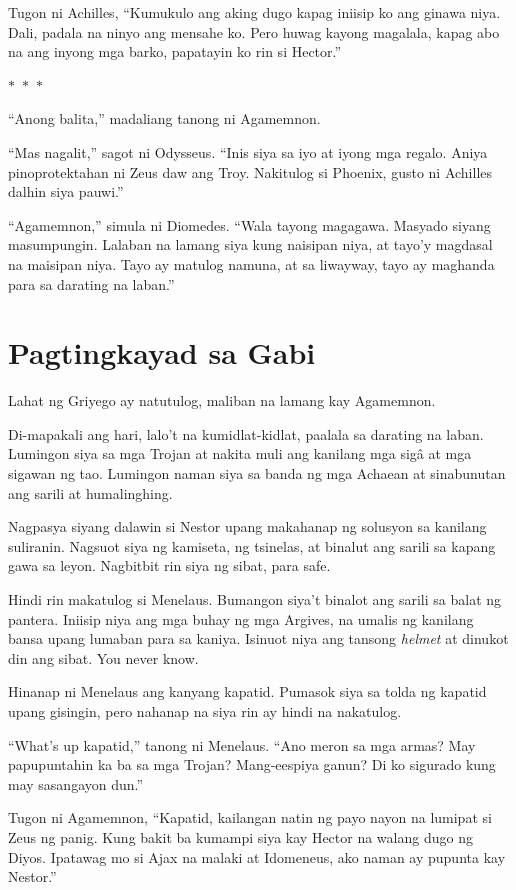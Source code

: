 \documentclass[12pt,letterpaper]{report}
\newcommand{\seperate}{\begin{center}$\ast$~$\ast$~$\ast$\end{center}}
\begin{document}
Tugon ni Achilles, ``Kumukulo ang aking dugo kapag iniisip ko ang ginawa niya. Dali, padala na ninyo ang mensahe ko. Pero huwag kayong magalala, kapag abo na ang inyong mga barko, papatayin ko rin si Hector.''

\seperate

``Anong balita,'' madaliang tanong ni Agamemnon.

``Mas nagalit,'' sagot ni Odysseus. ``Inis siya sa iyo at iyong mga regalo. Aniya pinoprotektahan ni Zeus daw ang Troy. Nakitulog si Phoenix, gusto ni Achilles dalhin siya pauwi.''

``Agamemnon,'' simula ni Diomedes. ``Wala tayong magagawa. Masyado siyang masumpungin. Lalaban na lamang siya kung naisipan niya, at tayo'y magdasal na maisipan niya. Tayo ay matulog namuna, at sa liwayway, tayo ay maghanda para sa darating na laban.''

\pagebreak

\chapter{Pagtingkayad sa Gabi} %

Lahat ng Griyego ay natutulog, maliban na lamang kay Agamemnon.

Di-mapakali ang hari, lalo't na kumidlat-kidlat, paalala sa darating na laban. Lumingon siya sa mga Trojan at nakita muli ang kanilang mga sig\^a at mga sigawan ng tao. Lumingon naman siya sa banda ng mga Achaean at sinabunutan ang sarili at humalinghing.

Nagpasya siyang dalawin si Nestor upang makahanap ng solusyon sa kanilang suliranin. Nagsuot siya ng kamiseta, ng tsinelas, at binalut ang sarili sa kapang gawa sa leyon. Nagbitbit rin siya ng sibat, para safe.

Hindi rin makatulog si Menelaus. Bumangon siya't binalot ang sarili sa balat ng pantera. Iniisip niya ang mga buhay ng mga Argives, na umalis ng kanilang bansa upang lumaban para sa kaniya. Isinuot niya ang tansong \textit{helmet} at dinukot din ang sibat. You never know.

Hinanap ni Menelaus ang kanyang kapatid. Pumasok siya sa tolda ng kapatid upang gisingin, pero nahanap na siya rin ay hindi na nakatulog.

``What's up kapatid,'' tanong ni Menelaus. ``Ano meron sa mga armas? May papupuntahin ka ba sa mga Trojan? Mang-eespiya ganun? Di ko sigurado kung may sasangayon dun.''

Tugon ni Agamemnon, ``Kapatid, kailangan natin ng payo nayon na lumipat si Zeus ng panig. Kung bakit ba kumampi siya kay Hector na walang dugo ng Diyos. Ipatawag mo si Ajax na malaki at Idomeneus, ako naman ay pupunta kay Nestor.''
\end{document}
